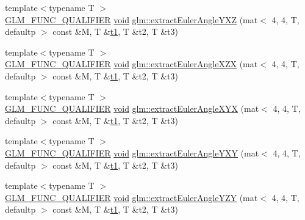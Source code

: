 \begin{DoxyCompactItemize}
\item 
{\footnotesize template$<$typename T $>$ }\\\mbox{\hyperlink{setup_8hpp_a33fdea6f91c5f834105f7415e2a64407}{G\+L\+M\+\_\+\+F\+U\+N\+C\+\_\+\+Q\+U\+A\+L\+I\+F\+I\+ER}} \mbox{\hyperlink{_s_d_l__opengles2__gl2ext_8h_ae5d8fa23ad07c48bb609509eae494c95}{void}} \mbox{\hyperlink{group__gtx__euler__angles_gaf0937518e63037335a0e8358b6f053c5}{glm\+::extract\+Euler\+Angle\+Y\+XZ}} (mat$<$ 4, 4, T, defaultp $>$ const \&M, T \&\mbox{\hyperlink{_s_d_l__opengl__glext_8h_af48031a37b713afa3b0d0d7d29653d7c}{t1}}, T \&t2, T \&t3)
\item 
{\footnotesize template$<$typename T $>$ }\\\mbox{\hyperlink{setup_8hpp_a33fdea6f91c5f834105f7415e2a64407}{G\+L\+M\+\_\+\+F\+U\+N\+C\+\_\+\+Q\+U\+A\+L\+I\+F\+I\+ER}} \mbox{\hyperlink{_s_d_l__opengles2__gl2ext_8h_ae5d8fa23ad07c48bb609509eae494c95}{void}} \mbox{\hyperlink{group__gtx__euler__angles_gacf0bc6c031f25fa3ee0055b62c8260d0}{glm\+::extract\+Euler\+Angle\+X\+ZX}} (mat$<$ 4, 4, T, defaultp $>$ const \&M, T \&\mbox{\hyperlink{_s_d_l__opengl__glext_8h_af48031a37b713afa3b0d0d7d29653d7c}{t1}}, T \&t2, T \&t3)
\item 
{\footnotesize template$<$typename T $>$ }\\\mbox{\hyperlink{setup_8hpp_a33fdea6f91c5f834105f7415e2a64407}{G\+L\+M\+\_\+\+F\+U\+N\+C\+\_\+\+Q\+U\+A\+L\+I\+F\+I\+ER}} \mbox{\hyperlink{_s_d_l__opengles2__gl2ext_8h_ae5d8fa23ad07c48bb609509eae494c95}{void}} \mbox{\hyperlink{group__gtx__euler__angles_gaf1077a72171d0f3b08f022ab5ff88af7}{glm\+::extract\+Euler\+Angle\+X\+YX}} (mat$<$ 4, 4, T, defaultp $>$ const \&M, T \&\mbox{\hyperlink{_s_d_l__opengl__glext_8h_af48031a37b713afa3b0d0d7d29653d7c}{t1}}, T \&t2, T \&t3)
\item 
{\footnotesize template$<$typename T $>$ }\\\mbox{\hyperlink{setup_8hpp_a33fdea6f91c5f834105f7415e2a64407}{G\+L\+M\+\_\+\+F\+U\+N\+C\+\_\+\+Q\+U\+A\+L\+I\+F\+I\+ER}} \mbox{\hyperlink{_s_d_l__opengles2__gl2ext_8h_ae5d8fa23ad07c48bb609509eae494c95}{void}} \mbox{\hyperlink{group__gtx__euler__angles_gaab8868556361a190db94374e9983ed39}{glm\+::extract\+Euler\+Angle\+Y\+XY}} (mat$<$ 4, 4, T, defaultp $>$ const \&M, T \&\mbox{\hyperlink{_s_d_l__opengl__glext_8h_af48031a37b713afa3b0d0d7d29653d7c}{t1}}, T \&t2, T \&t3)
\item 
{\footnotesize template$<$typename T $>$ }\\\mbox{\hyperlink{setup_8hpp_a33fdea6f91c5f834105f7415e2a64407}{G\+L\+M\+\_\+\+F\+U\+N\+C\+\_\+\+Q\+U\+A\+L\+I\+F\+I\+ER}} \mbox{\hyperlink{_s_d_l__opengles2__gl2ext_8h_ae5d8fa23ad07c48bb609509eae494c95}{void}} \mbox{\hyperlink{group__gtx__euler__angles_ga11dad972c109e4bf8694c915017c44a6}{glm\+::extract\+Euler\+Angle\+Y\+ZY}} (mat$<$ 4, 4, T, defaultp $>$ const \&M, T \&\mbox{\hyperlink{_s_d_l__opengl__glext_8h_af48031a37b713afa3b0d0d7d29653d7c}{t1}}, T \&t2, T \&t3)

\end{DoxyCompactItemize}
